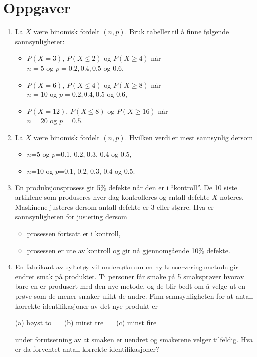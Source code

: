 \section{Oppgaver}
\small
\begin{enumerate}
\item La $X$ være binomisk fordelt $(n,p)$. Bruk tabeller til å
     finne følgende sannsynligheter:
     \begin{itemize}
     \item[(a)]  $P(X=3)$, $P(X\leq 2)$ og $P(X\geq 4)$ når \\
          $n=5$ og $p=0.2, 0.4, 0.5$ og $0.6$,
     \item[(b)]  $P(X=6)$, $P(X\leq 4)$ og $P(X\geq 8)$ når \\
          $n=10$ og $p=0.2, 0.4, 0.5$ og $0.6$,
     \item[(c)]  $P(X=12)$, $P(X\leq 8)$ og $P(X\geq 16)$ når \\
          $n=20$ og $p=0.5$.
     \end{itemize}

\item La $X$ være binomisk fordelt $(n,p)$. Hvilken verdi er mest
     sannsynlig dersom
     \begin{itemize}
     \item[(a)]  $n$=5 og $p$=0.1, 0.2, 0.3, 0.4 og 0.5,
     \item[(b)]  $n$=10 og $p$=0.1, 0.2, 0.3, 0.4 og 0.5.
     \end{itemize}

\item En produksjonsprosess gir 5\% defekte når den er i
     ``kontroll''. De 10 siste artiklene som produseres hver dag
     kontrolleres og antall defekte $X$ noteres. Maskinene
     justeres dersom antall defekte er 3 eller større. Hva er
     sannsynligheten for justering dersom
     \begin{itemize}
     \item[(a)]  prosessen fortsatt er i kontroll,
     \item[(b)]  prosessen er ute av kontroll og gir nå gjennomgående
                 10\%  defekte.
     \end{itemize}

\item En fabrikant av syltetøy vil undersøke om en ny
     konserveringsmetode gir endret smak på produktet. Ti
     personer får smake på 5 smaksprøver hvorav bare en er
     produsert med den nye metode, og de blir bedt om å velge ut
     en prøve som de mener smaker ulikt de andre. Finn
     sannsynligheten for at antall korrekte identifikasjoner av
     det nye produkt er
     \begin{center}
     (a) høyst to  \ \ \ (b) minst tre \ \ \ (c) minst fire
     \end{center}
     under forutsetning av at smaken er uendret og smakerene
     velger tilfeldig. Hva er da forventet antall korrekte
     identifikasjoner?


\end{enumerate}
